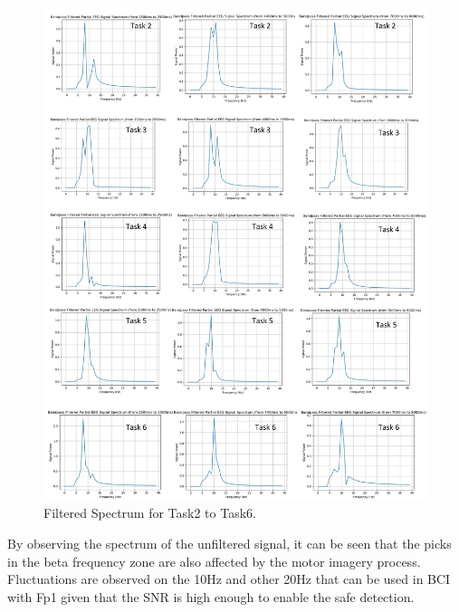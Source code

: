 \begin{figure}%
	\centering
	\includegraphics[width=\linewidth]{Figures/filteredAll.jpg} 
	\caption{Filtered Spectrum for Task2 to Task6.} 
	\label{all_tasks_filt} 
\end{figure}

By observing the spectrum of the unfiltered signal, it can be seen that the picks in the beta frequency zone are also affected by the motor imagery process. Fluctuations are observed on the 10Hz and other 20Hz that can be used in BCI with Fp1 given that the SNR is high enough to enable the safe detection.


